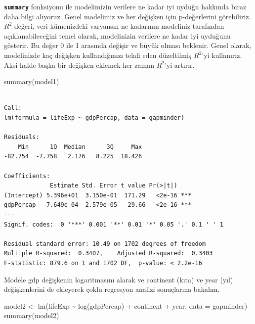 \documentclass[
  letterpaper,
  DIV=11,
  numbers=noendperiod]{scrreprt}
\newenvironment{Shaded}{\begin{snugshade}}{\end{snugshade}}
\newcommand{\AttributeTok}[1]{\textcolor[rgb]{0.40,0.45,0.13}{#1}}
\newcommand{\FunctionTok}[1]{\textcolor[rgb]{0.28,0.35,0.67}{#1}}
\newcommand{\NormalTok}[1]{\textcolor[rgb]{0.00,0.23,0.31}{#1}}
\newcommand{\OtherTok}[1]{\textcolor[rgb]{0.00,0.23,0.31}{#1}}
\newcommand{\SpecialCharTok}[1]{\textcolor[rgb]{0.37,0.37,0.37}{#1}}
\begin{document}
\textbf{\texttt{summary}} fonksiyonu ile modelimizin verilere ne kadar
iyi uyduğu hakkında biraz daha bilgi alıyoruz. Genel modelimiz ve her
değişken için p-değerlerini görebiliriz. \(R^2\) değeri, veri
kümenizdeki varyansın ne kadarının modeliniz tarafından
açıklanabileceğini temel olarak, modelinizin verilere ne kadar iyi
uyduğunu gösterir. Bu değer 0 ile 1 arasında değişir ve büyük olması
beklenir. Genel olarak, modelinizde kaç değişken kullandığınızı telafi
eden düzeltilmiş \(R^2\)'yi kullanırız. Aksi halde başka bir değişken
eklemek her zaman \(R^2\)'yi artırır.

\begin{Shaded}
\begin{Highlighting}[]
\FunctionTok{summary}\NormalTok{(model1)}
\end{Highlighting}
\end{Shaded}

\begin{verbatim}

Call:
lm(formula = lifeExp ~ gdpPercap, data = gapminder)

Residuals:
    Min      1Q  Median      3Q     Max 
-82.754  -7.758   2.176   8.225  18.426 

Coefficients:
             Estimate Std. Error t value Pr(>|t|)    
(Intercept) 5.396e+01  3.150e-01  171.29   <2e-16 ***
gdpPercap   7.649e-04  2.579e-05   29.66   <2e-16 ***
---
Signif. codes:  0 '***' 0.001 '**' 0.01 '*' 0.05 '.' 0.1 ' ' 1

Residual standard error: 10.49 on 1702 degrees of freedom
Multiple R-squared:  0.3407,    Adjusted R-squared:  0.3403 
F-statistic: 879.6 on 1 and 1702 DF,  p-value: < 2.2e-16
\end{verbatim}

Modele gdp değişkenin logaritmasını alarak ve continent (kıta) ve year
(yıl) değişkenlerini de ekleyerek çoklu regresyon analizi sonuçlarına
bakalım.

\begin{Shaded}
\begin{Highlighting}[]
\NormalTok{model2 }\OtherTok{\textless{}{-}} \FunctionTok{lm}\NormalTok{(lifeExp }\SpecialCharTok{\textasciitilde{}} \FunctionTok{log}\NormalTok{(gdpPercap) }\SpecialCharTok{+}\NormalTok{ continent }\SpecialCharTok{+}\NormalTok{ year, }\AttributeTok{data =}\NormalTok{ gapminder)}
\FunctionTok{summary}\NormalTok{(model2)}
\end{Highlighting}
\end{Shaded}
\end{document}
